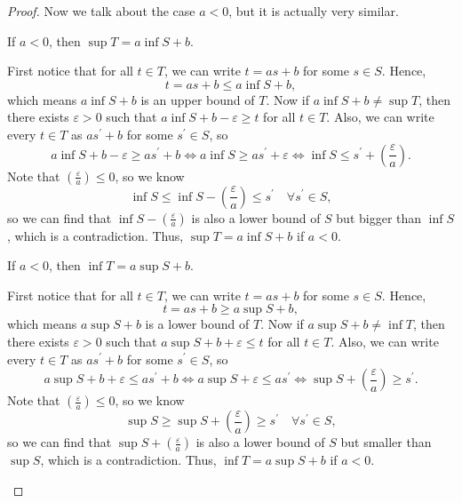 \begin{proof}
Now we talk about the case \(a < 0\), but it is actually very similar. 
\begin{claim}
  If \(a < 0\), then \(\sup T = a \inf S + b\). 
\end{claim}
\begin{explanation}
  First notice that for all \(t \in T\), we can write \(t = as + b\) for some \(s \in S\). Hence, 
  \[
    t = as + b \le a \inf S + b,
  \] which means \(a \inf S + b\) is an upper bound of \(T\). Now if \(a \inf S + b \neq \sup T\), then there exists \(\varepsilon > 0\) such that \(a \inf S + b - \varepsilon \ge t\) for all \(t \in T\). Also, we can write every \(t \in T\) as \(as^{\prime}  + b\) for some \(s^{\prime} \in S\), so 
  \[
    a \inf S + b - \varepsilon \ge a s^{\prime} + b \iff a \inf S \ge a s^{\prime} + \varepsilon \iff \inf S \le s^{\prime} + \left( \frac{\varepsilon}{a} \right). 
  \] Note that \(\left( \frac{\varepsilon}{a} \right) \le 0\), so we know 
  \[
    \inf S \le \inf S - \left( \frac{\varepsilon}{a} \right) \le s^{\prime} \quad \forall s^{\prime} \in S, 
  \] so we can find that \(\inf S - \left( \frac{\varepsilon}{a} \right) \) is also a lower bound of \(S\) but bigger than \(\inf S\), which is a contradiction. Thus, \(\sup T = a \inf S + b\) if \(a < 0\).    
\end{explanation}

\begin{claim}
  If \(a < 0\), then \(\inf T = a \sup S + b\).  
\end{claim}
\begin{explanation}
    First notice that for all \(t \in T\), we can write \(t = as + b\) for some \(s \in S\). Hence, 
  \[
    t = as + b \ge a \sup S + b,
  \] which means \(a \sup S + b\) is a lower bound of \(T\). Now if \(a \sup S + b \neq \inf T\), then there exists \(\varepsilon > 0\) such that \(a \sup S + b + \varepsilon \le t\) for all \(t \in T\). Also, we can write every \(t \in T\) as \(as^{\prime}  + b\) for some \(s^{\prime} \in S\), so 
  \[
    a \sup S + b + \varepsilon \le a s^{\prime} + b \iff a \sup S + \varepsilon  \le a s^{\prime}\iff \sup S + \left( \frac{\varepsilon}{a} \right) \ge s^{\prime}. 
  \] Note that \(\left( \frac{\varepsilon}{a} \right) \le 0\), so we know 
  \[
    \sup S \ge \sup S + \left( \frac{\varepsilon}{a} \right) \ge s^{\prime} \quad \forall s^{\prime} \in S, 
  \] so we can find that \(\sup S + \left( \frac{\varepsilon}{a} \right) \) is also a lower bound of \(S\) but smaller than \(\sup S\), which is a contradiction. Thus, \(\inf T = a \sup S + b\) if \(a < 0\). 
\end{explanation}
\end{proof}